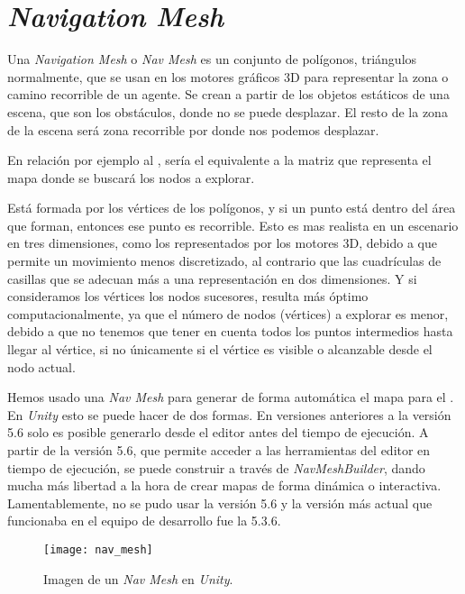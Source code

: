
\section{\textit{Navigation Mesh}} \label{referenciaNavMesh}
Una \textit{Navigation Mesh} o \textit{Nav Mesh} es un conjunto de polígonos, triángulos normalmente, que se usan en los motores gráficos 3D para representar la zona o camino recorrible de un agente. Se crean a partir de los objetos estáticos de una escena, que son los obstáculos, donde no se puede desplazar. El resto de la zona de la escena será zona recorrible por donde nos podemos desplazar.

En relación por ejemplo al \Astar, sería el equivalente a la matriz que representa el mapa donde se buscará los nodos a explorar.

Está formada por los vértices de los polígonos, y si un punto está dentro del área que forman, entonces ese punto es recorrible. Esto es mas realista en un escenario en tres dimensiones, como los representados por los motores 3D, debido a que permite un movimiento menos discretizado, al contrario que las cuadrículas de casillas que se adecuan más a una representación en dos dimensiones. Y si consideramos los vértices los nodos sucesores, resulta más óptimo computacionalmente, ya que el número de nodos (vértices) a explorar es menor, debido a que no tenemos que tener en cuenta todos los puntos intermedios hasta llegar al vértice, si no únicamente si el vértice es visible o alcanzable desde el nodo actual.

Hemos usado una \textit{Nav Mesh} para generar de forma automática el mapa para el \Astar. En \textit{Unity} esto se puede hacer de dos formas. En versiones anteriores a la versión 5.6 solo es posible generarlo desde el editor antes del tiempo de ejecución. A partir de la versión 5.6, que permite acceder a las herramientas del editor en tiempo de ejecución, se puede construir a través de \textit{NavMeshBuilder}, dando mucha más libertad a la hora de crear mapas de forma dinámica o interactiva. Lamentablemente, no se pudo usar la versión 5.6 y la versión más actual que funcionaba en el equipo de desarrollo fue la 5.3.6.

\begin{figure}[htpb]
    \centering
    \texttt{[image: nav\_mesh]}
    \caption[Imagen de un \textit{Nav Mesh} en \textit{Unity}]{Imagen de un \textit{Nav Mesh} en \textit{Unity}.}
    \label{fig:basics AFM sketch}
\end{figure}

